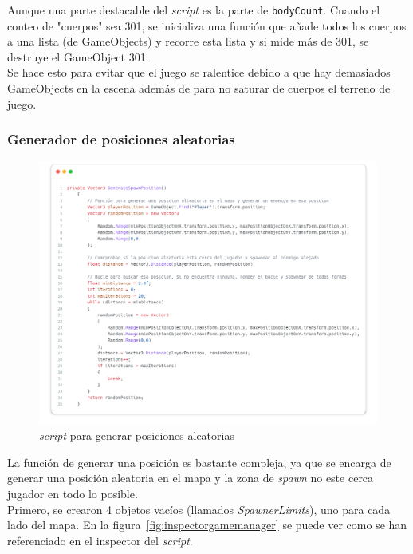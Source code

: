 \documentclass[11pt]{article}
\begin{document}
                Aunque una parte destacable del \textit{script} es la parte de \texttt{bodyCount}. Cuando el conteo de "cuerpos" sea 301, se inicializa una función que añade todos los cuerpos a una lista (de GameObjects) y recorre esta lista y si mide más de 301, se destruye el GameObject 301.\\

                Se hace esto para evitar que el juego se ralentice debido a que hay demasiados GameObjects en la escena además de para no saturar de cuerpos el terreno de juego.\\

            \newpage
            \subsubsection{Generador de posiciones aleatorias}
                \begin{figure}[H]
                    \centering
                    \includegraphics[width=\textwidth]{Images/Misc/generatespawnposition.png}
                    \caption{\textit{script} para generar posiciones aleatorias}
                \end{figure}
                La función de generar una posición es bastante compleja, ya que se encarga de generar una posición aleatoria en el mapa y la zona de \textit{spawn} no este cerca jugador en todo lo posible.\\

                Primero, se crearon 4 objetos vacíos (llamados \textit{SpawnerLimits}), uno para cada lado del mapa. En la figura~\ref{fig:inspectorgamemanager} se puede ver como se han referenciado en el inspector del \textit{script}.\\
\end{document}
